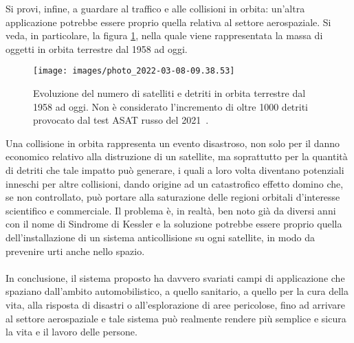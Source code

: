 Si provi, infine, a guardare al traffico e alle collisioni in orbita: un'altra applicazione potrebbe essere proprio quella relativa al settore aerospaziale. Si veda, in particolare, la figura \ref{fig:photo2022-03-08-09}, nella quale viene rappresentata la massa di oggetti in orbita terrestre dal 1958 ad oggi.\begin{figure}[H]
	\centering
	\texttt{[image: images/photo\_2022-03-08-09.38.53]}
	\caption{Evoluzione del numero di satelliti e detriti in orbita terrestre dal 1958 ad oggi. Non è considerato l’incremento di oltre 1000 detriti provocato dal test ASAT russo del 2021~\cite{29}.}
	\label{fig:photo2022-03-08-09}
\end{figure}Una collisione in orbita rappresenta un evento disastroso, non solo per il danno economico relativo alla distruzione di un satellite, ma soprattutto per la quantità di detriti che tale impatto può generare, i quali a loro volta diventano potenziali inneschi per altre collisioni, dando origine ad un catastrofico effetto domino che, se non controllato, può portare alla saturazione delle regioni orbitali d’interesse scientifico e commerciale. Il problema è, in realtà, ben noto già da diversi anni con il nome di Sindrome di Kessler e la soluzione potrebbe essere proprio quella dell'installazione di un sistema anticollisione su ogni satellite, in modo da prevenire urti anche nello spazio.\\\\
In conclusione, il sistema proposto ha davvero svariati campi di applicazione che spaziano dall’ambito automobilistico, a quello sanitario, a quello per la cura della vita, alla risposta di disastri o all’esplorazione di aree pericolose, fino ad arrivare al settore aerospaziale e tale sistema può realmente rendere più semplice e sicura la vita e il lavoro delle persone.
